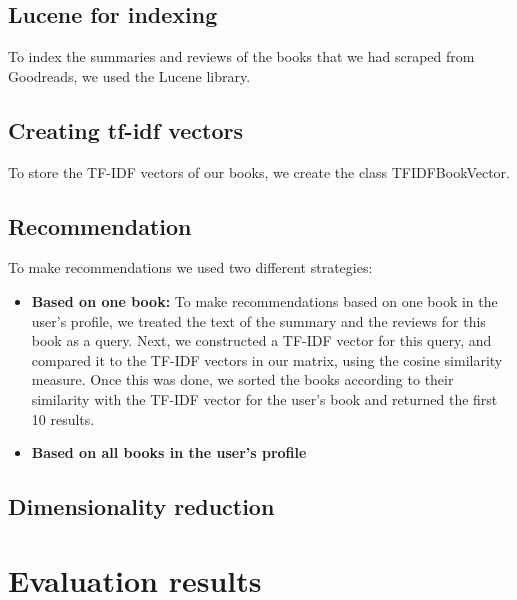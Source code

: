 \documentclass[10pt,a4paper]{paper}
\begin{document}
\subsection{Lucene for indexing}

To index the summaries and reviews of the books that we had scraped from Goodreads, we used the Lucene library. %

\subsection{Creating tf-idf vectors}

To store the TF-IDF vectors of our books, we create the class TFIDFBookVector.


\subsection{Recommendation}

To make recommendations we used two different strategies:
\begin{itemize}
\item \textbf{Based on one book:} To make recommendations based on one book in the user's profile, we treated the text of the summary and the reviews for this book as a query. Next, we constructed a TF-IDF vector for this query, and compared it to the TF-IDF vectors in our matrix, using the cosine similarity measure. Once this was done, we sorted the books according to their similarity with the TF-IDF vector for the user's book and returned the first 10 results.
\item \textbf{Based on all books in the user's profile} %
\end{itemize}

\subsection{Dimensionality reduction}


\section{Evaluation results}
\end{document}
